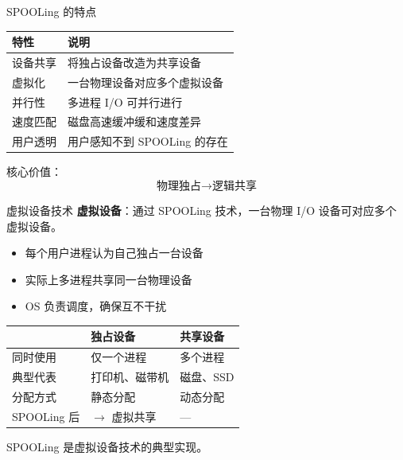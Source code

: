 \documentclass[10pt, aspectratio=169]{beamer}
\begin{document}
\begin{frame}{SPOOLing 的特点}
    \begin{center}
        \begin{tabular}{|l|l|}
            \hline
            \textbf{特性} & \textbf{说明} \\
            \hline
            设备共享 & 将独占设备改造为共享设备 \\
            虚拟化 & 一台物理设备对应多个虚拟设备 \\
            并行性 & 多进程 I/O 可并行进行 \\
            速度匹配 & 磁盘高速缓冲缓和速度差异 \\
            用户透明 & 用户感知不到 SPOOLing 的存在 \\
            \hline
        \end{tabular}
    \end{center}
    \vspace{0.5em}
    核心价值：
    \[
    \boxed{\text{物理独占} \rightarrow \text{逻辑共享}}
    \]
\end{frame}

\begin{frame}{虚拟设备技术}
    \textbf{虚拟设备}：通过 SPOOLing 技术，一台物理 I/O 设备可对应多个虚拟设备。
    \vspace{0.5em}
    \begin{itemize}
        \item 每个用户进程认为自己独占一台设备
        \item 实际上多进程共享同一台物理设备
        \item OS 负责调度，确保互不干扰
    \end{itemize}
    \vspace{0.5em}
    \begin{center}
        \begin{tabular}{|l|l|l|}
            \hline
            & \textbf{独占设备} & \textbf{共享设备} \\
            \hline
            同时使用 & 仅一个进程 & 多个进程 \\
            典型代表 & 打印机、磁带机 & 磁盘、SSD \\
            分配方式 & 静态分配 & 动态分配 \\
            SPOOLing 后 & $\rightarrow$ 虚拟共享 & --- \\
            \hline
        \end{tabular}
    \end{center}
    \vspace{0.5em}
    SPOOLing 是虚拟设备技术的典型实现。
\end{frame}
\end{document}
